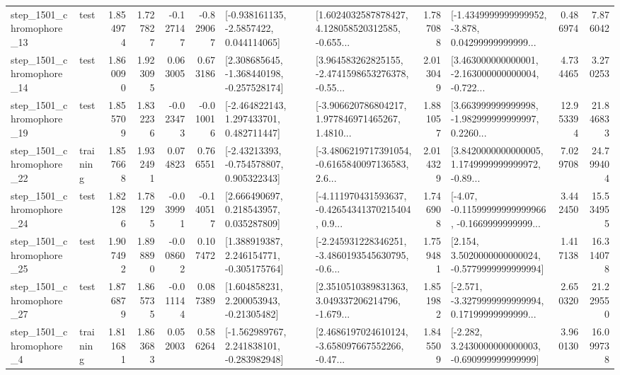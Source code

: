 \begin{tabular}{llrrrrllrlrr}
 step\_1501\_chromophore\_13 &      test &      1.854974 &    1.727827 &     -0.127147 & -0.829067 &     [-0.938161135, -2.5857422, 0.044114065] &  [1.6024032587878427, 4.128058520312585, -0.655... &       1.787088 &  [-1.4349999999999952, -3.878, 0.04299999999999... &            0.486974 &          7.876042 \\
 step\_1501\_chromophore\_14 &      test &      1.860090 &    1.923095 &      0.063005 &  0.673186 &   [2.308685645, -1.368440198, -0.257528174] &  [3.964583262825155, -2.4741598653276378, -0.55... &       2.013049 &  [3.463000000000001, -2.163000000000004, -0.722... &            4.734465 &          3.270253 \\
 step\_1501\_chromophore\_19 &      test &      1.855709 &    1.832236 &     -0.023473 & -0.010016 &    [-2.464822143, 1.297433701, 0.482711447] &  [-3.906620786804217, 1.977846971465267, 1.4810... &       1.881057 &  [3.663999999999998, -1.982999999999997, 0.2260... &           12.953394 &         21.846833 \\
 step\_1501\_chromophore\_22 &  training &      1.857668 &    1.932491 &      0.074823 &  0.766551 &    [-2.43213393, -0.754578807, 0.905322343] &  [-3.4806219717391054, -0.6165840097136583, 2.6... &       2.014329 &  [3.8420000000000005, 1.1749999999999972, -0.89... &            7.029708 &         24.799404 \\
 step\_1501\_chromophore\_24 &      test &      1.821286 &    1.781295 &     -0.039991 & -0.140517 &     [2.666490697, 0.218543957, 0.035287809] &  [-4.111970431593637, -0.42654341370215404, 0.9... &       1.746908 &  [-4.07, -0.11599999999999966, -0.1669999999999... &            3.442450 &         15.534955 \\
 step\_1501\_chromophore\_25 &      test &      1.907492 &    1.898890 &     -0.008602 &  0.107472 &    [1.388919387, 2.246154771, -0.305175764] &  [-2.245931228346251, -3.4860193545630795, -0.6... &       1.759481 &   [2.154, 3.5020000000000024, -0.5779999999999994] &            1.417138 &         16.314078 \\
 step\_1501\_chromophore\_27 &      test &      1.876879 &    1.865735 &     -0.011144 &  0.087389 &     [1.604858231, 2.200053943, -0.21305482] &  [2.3510510389831363, 3.049337206214796, -1.679... &       1.851982 &  [-2.571, -3.3279999999999994, 0.17199999999999... &            2.650320 &         21.229550 \\
  step\_1501\_chromophore\_4 &  training &      1.811681 &    1.863683 &      0.052003 &  0.586264 &   [-1.562989767, 2.241838101, -0.283982948] &  [2.4686197024610124, -3.658097667552266, -0.47... &       1.845509 &   [-2.282, 3.2430000000000003, -0.690999999999999] &            3.960130 &         16.099738 \\

\end{tabular}
